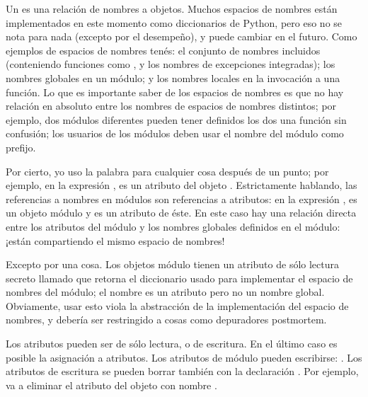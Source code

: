 \documentclass[a5paper,10pt,spanish]{sphinxmanual}
\begin{document}
\sphinxAtStartPar
Un  es una relación de nombres a objetos.  Muchos espacios de nombres están implementados en este momento como diccionarios de Python, pero eso no se nota para nada (excepto por el desempeño), y puede cambiar en el futuro.  Como ejemplos de espacios de nombres tenés: el conjunto de nombres incluidos (conteniendo funciones como , y los nombres de excepciones integradas); los nombres globales en un módulo; y los nombres locales en la invocación a una función.  Lo que es importante saber de los espacios de nombres es que no hay relación en absoluto entre los nombres de espacios de nombres distintos; por ejemplo, dos módulos diferentes pueden tener definidos los dos una función  sin confusión; los usuarios de los módulos deben usar el nombre del módulo como prefijo.

\sphinxAtStartPar
Por cierto, yo uso la palabra  para cualquier cosa después de un punto; por ejemplo, en la expresión ,  es un atributo del objeto .  Estrictamente hablando, las referencias a nombres en módulos son referencias a atributos: en la expresión ,  es un objeto módulo y  es un atributo de éste.  En este caso hay una relación directa entre los atributos del módulo y los nombres globales definidos en el módulo: ¡están compartiendo el mismo espacio de nombres! %
\begin{footnote}[1]\sphinxAtStartFootnote
Excepto por una cosa. Los objetos módulo tienen un atributo de sólo lectura secreto llamado  que retorna el diccionario usado para implementar el espacio de nombres del módulo; el nombre  es un atributo pero no un nombre global. Obviamente, usar esto viola la abstracción de la implementación del espacio de nombres, y debería ser restringido a cosas como depuradores post\sphinxhyphen{}mortem.
%
\end{footnote}

\sphinxAtStartPar
Los atributos pueden ser de sólo lectura, o de escritura.  En el último caso es posible la asignación a atributos.  Los atributos de módulo pueden escribirse: .  Los atributos de escritura se pueden borrar también con la declaración .  Por ejemplo,  va a eliminar el atributo  del objeto con nombre .
\end{document}
